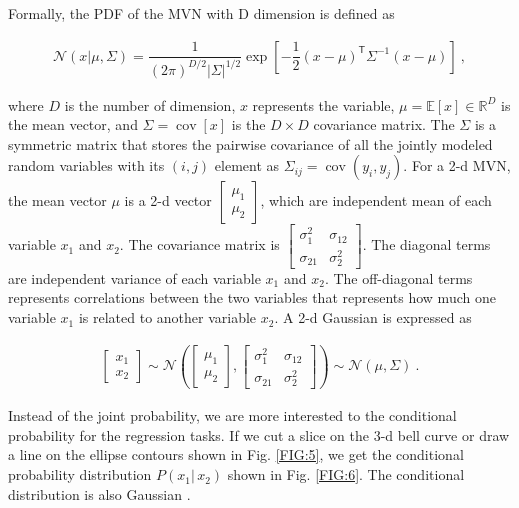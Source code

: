 \documentclass[12pt,letterpaper,fleqn,oneside,titlepage]{offroad-report}
\begin{document}
Formally, the PDF of the MVN with D dimension is defined as \cite{Murphy2012}
\begin{ceqn}
    \begin{align}
       \mathcal{N}(x | \mu,\Sigma) = \dfrac{1}{(2\pi)^{D/2}|\Sigma|^{1/2}}\exp\left[-\dfrac{1}{2}(x-\mu)^\mathsf{T} \Sigma^{-1}(x-\mu)\right] \ , \nonumber
    \end{align}
\end{ceqn}
where $D$ is the number of dimension, $x$ represents the variable, $\mu=\mathbb{E}[x] \in \mathbb{R}^D$ is the mean vector, and $\Sigma=\operatorname{cov}[x]$ is the $D \times D$ covariance matrix. The $\Sigma$ is a symmetric matrix that stores the pairwise covariance of all the jointly modeled random variables with its $(i,j)$ element as $\Sigma_{ij}=\operatorname{cov}(y_i,y_j)$. For a 2-d MVN, the mean vector $\mu$ is a 2-d vector $\begin{bmatrix} \mu_1 \\ \mu_2 \end{bmatrix}$, which are independent mean of each variable $x_1$ and $x_2$. The covariance matrix is $\begin{bmatrix} \sigma^2_1 & \sigma_{12} \\ \sigma_{21} & \sigma^2_2 \end{bmatrix}$. The diagonal terms are independent variance of each variable $x_1$ and $x_2$. The off-diagonal terms represents correlations between the two variables that represents how much one variable $x_1$ is related to another variable $x_2$. A 2-d Gaussian is expressed as 
\begin{ceqn}
    \begin{align}
       \begin{bmatrix} x_1 \\ x_2 \end{bmatrix} \sim \mathcal{N}\left(\begin{bmatrix} \mu_1 \\ \mu_2 \end{bmatrix}, \begin{bmatrix} \sigma^2_1 & \sigma_{12} \\ \sigma_{21} & \sigma^2_2 \end{bmatrix}\right) \sim \mathcal{N}(\mu, \Sigma) \ . \nonumber
    \end{align}
\end{ceqn}
Instead of the joint probability, we are more interested to the conditional probability for the regression tasks. If we cut a slice on the 3-d bell curve or draw a line on the ellipse contours shown in Fig. \ref{FIG:5}, we get the conditional probability distribution $P(x_1 \vert \, x_2)$ shown in Fig. \ref{FIG:6}. The conditional distribution is also Gaussian \cite{Rasmussen2006}.
\end{document}
